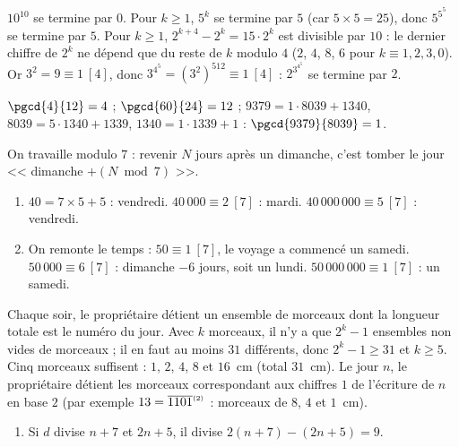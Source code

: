 \begin{corrige}
\begin{sol}
\begin{enumerate}
\end{enumerate}
\end{sol}
%
\begin{sol}
$10^{10}$ se termine par $0$. Pour $k \geq 1$, $5^k$ se termine par $5$ (car $5 \times 5 = 25$), donc $5^{5^5}$ se termine par $5$.
Pour $k \geq 1$, $2^{k+4} - 2^k = 15 \cdot 2^k$ est divisible par $10$ : le dernier chiffre de $2^k$ ne d\'epend que du reste de $k$ modulo $4$
($2$, $4$, $8$, $6$ pour $k \equiv 1, 2, 3, 0$). Or $3^2 = 9 \equiv 1 \ [4]$, donc $3^{4^5} = (3^2)^{512} \equiv 1 \ [4]$ :
$2^{3^{4^5}}$ se termine par $2$.
\end{sol}
%
\begin{sol}
$\pgcd{4}{12} = 4$ ; $\pgcd{60}{24} = 12$ ;
$9379 = 1 \cdot 8039 + 1340$, $8039 = 5 \cdot 1340 + 1339$, $1340 = 1 \cdot 1339 + 1$ : $\pgcd{9379}{8039} = 1$.
\end{sol}
%
\begin{sol}
On travaille modulo $7$ : revenir $N$ jours apr\`es un dimanche, c'est tomber le jour << dimanche $+ (N \bmod 7)$ >>.
\begin{enumerate}
\item $40 = 7 \times 5 + 5$ : vendredi. $40\,000 \equiv 2 \ [7]$ : mardi. $40\,000\,000 \equiv 5 \ [7]$ : vendredi.
\item On remonte le temps : $50 \equiv 1 \ [7]$, le voyage a commenc\'e un samedi.
      $50\,000 \equiv 6 \ [7]$ : dimanche $- 6$ jours, soit un lundi. $50\,000\,000 \equiv 1 \ [7]$ : un samedi.
\end{enumerate}
\end{sol}
%
\begin{sol}
Chaque soir, le propri\'etaire d\'etient un ensemble de morceaux dont la longueur totale est le num\'ero du jour.
Avec $k$ morceaux, il n'y a que $2^k - 1$ ensembles non vides de morceaux ; il en faut au moins $31$ diff\'erents, donc $2^k - 1 \geq 31$ et $k \geq 5$.
Cinq morceaux suffisent : $1$, $2$, $4$, $8$ et $16$~cm (total $31$~cm). Le jour $n$, le propri\'etaire d\'etient les morceaux
correspondant aux chiffres $1$ de l'\'ecriture de $n$ en base $2$ (par exemple $13 = \overline{1101}^{_{(2)}}$ : morceaux de $8$, $4$ et $1$~cm).
\end{sol}
%
\begin{sol}
\begin{enumerate}
\item Si $d$ divise $n+7$ et $2n+5$, il divise $2(n+7) - (2n+5) = 9$.

\end{enumerate}
\end{sol}
\end{corrige}
